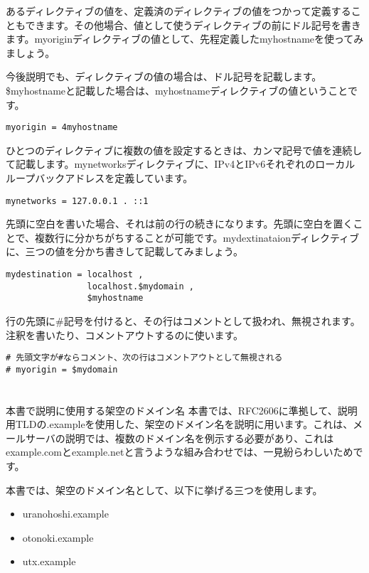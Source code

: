 あるディレクティブの値を、定義済のディレクティブの値をつかって定義することもできます。その他場合、値として使うディレクティブの前にドル記号を書きます。myoriginディレクティブの値として、先程定義したmyhostnameを使ってみましょう。

今後説明でも、ディレクティブの値の場合は、ドル記号を記載します。\$myhostnameと記載した場合は、myhostnameディレクティブの値ということです。

\begin{lstlisting}[basicstyle=\ttfamily\footnotesize, frame=single]
myorigin = 4myhostname
\end{lstlisting}

ひとつのディレクティブに複数の値を設定するときは、カンマ記号で値を連続して記載します。mynetworksディレクティブに、IPv4とIPv6それぞれのローカルループバックアドレスを定義しています。

\begin{lstlisting}[basicstyle=\ttfamily\footnotesize, frame=single]
mynetworks = 127.0.0.1 . ::1
\end{lstlisting}

先頭に空白を書いた場合、それは前の行の続きになります。先頭に空白を置くことで、複数行に分かちがちすることが可能です。mydextinataionディレクティブに、三つの値を分かち書きして記載してみましょう。

\begin{lstlisting}[basicstyle=\ttfamily\footnotesize, frame=single]
mydestination = localhost ,
                localhost.$mydomain ,
                $myhostname
\end{lstlisting}

行の先頭に\#記号を付けると、その行はコメントとして扱われ、無視されます。注釈を書いたり、コメントアウトするのに使います。

\begin{lstlisting}[basicstyle=\ttfamily\footnotesize, frame=single]
# 先頭文字が#ならコメント、次の行はコメントアウトとして無視される
# myorigin = $mydomain
\end{lstlisting}

\section*{}
\begin{itembox}[l]{本書で説明に使用する架空のドメイン名}
本書では、RFC2606に準拠して、説明用TLDの.exampleを使用した、架空のドメイン名を説明に用います。これは、メールサーバの説明では、複数のドメイン名を例示する必要があり、これはexample.comとexample.netと言うような組み合わせでは、一見紛らわしいためです。

本書では、架空のドメイン名として、以下に挙げる三つを使用します。

\begin{itemize}
 \item uranohoshi.example
 \item otonoki.example
 \item utx.example
\end{itemize}
\end{itembox}


